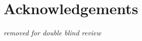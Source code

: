 \documentclass[pldi]{sigplanconf-pldi15}
\begin{document}
\section{Acknowledgements}

{\em removed for double blind review}


{}
\end{document}
